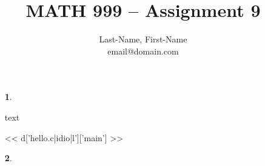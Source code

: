 \newcommand{\preamblefolder}{./include}       %

\usepackage[enable]{easy-todo}                %
\newenvironment{code}{\manni}{\endmanni}

\title{MATH 999 -- Assignment 9}
\author{
  Last-Name, First-Name\\
  {\selectfont email@domain.com}
}


  \maketitle

    \begin{enumerate}
      \item[\textbf{1}.]
      
        \aspace
        
        text


\begin{code}[test]
<< d['hello.c|idio|l']['main'] >>
\end{code}

      \qspace

      \item[\textbf{2}.]
      
        \aspace

      
      
    \end{enumerate}


  \begin{bibdiv}
    \begin{biblist}
    \end{biblist}
  \end{bibdiv}

  \listoftodos


